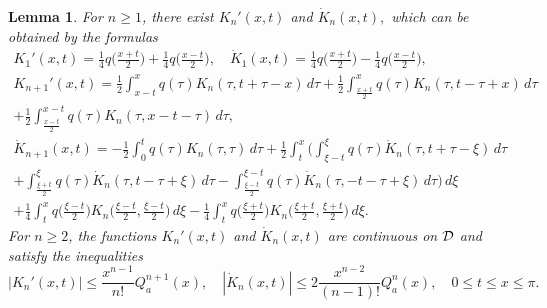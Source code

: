 \documentclass[a4paper, 12pt] {article}
\theoremstyle{plain}
\newtheorem{lemma}{\indent Lemma}
\theoremstyle{remark}
\theoremstyle{plain}
\theoremstyle{definition}
\numberwithin{equation}{section}
\begin{document}
\begin{lemma}
For $n \ge 1$, there exist $K_n'(x, t)$ and $\dot K_n(x, t),$ which can be obtained by the formulas
\begin{equation} \label{first der}
\begin{split}
K_1'(x,t) = \frac{1}{4} q\Big(\frac{x+t}{2}\Big) + \frac{1}{4}q\Big(\frac{x-t}{2}\Big),
\quad {\dot K}_1(x, t) = \frac14 q\Big(\frac{x+t}{2}\Big) - \frac14 q\Big(\frac{x-t}{2}\Big),
\\[2mm]
K_{n+1}'(x, t) = \frac12 \int_{x-t}^x q(\tau) K_n(\tau, t + \tau - x) \,d\tau + \frac12 \int_{\frac{x+t}{2}}^x q(\tau) K_n(\tau, t-\tau+x)\,d\tau \\
+\frac12 \int_{\frac{x-t}{2}}^{x-t} q(\tau) K_n(\tau,x-t-\tau)\,d\tau,
\\
{\dot K}_{n+1}(x, t) = -\frac{1}{2} \int_0^t q(\tau) K_n(\tau, \tau) \, d\tau +\frac12 \int_t^x \Bigg(\int_{\xi-t}^\xi q(\tau){\dot K}_n(\tau, t+\tau-\xi)\,d\tau \\
+\int_{\frac{\xi+t}{2}}^\xi q(\tau){\dot K}_n(\tau, t-\tau+\xi)\,d\tau 
- \int_{\frac{\xi-t}{2}}^{\xi-t} q(\tau){\dot K}_n(\tau, -t-\tau+\xi)\,d\tau\Bigg)\,d\xi \\
+ \frac{1}{4} \int_t^x q\Big(\frac{\xi-t}{2}\Big) K_n\Big(\frac{\xi-t}{2},\frac{\xi-t}{2}\Big) \,d\xi
- \frac{1}{4} \int_t^x q\Big(\frac{\xi+t}{2}\Big) K_n\Big(\frac{\xi+t}{2},\frac{\xi+t}{2}\Big)\, d\xi.
\end{split}
\end{equation}
For $n \ge 2$, the functions $K_n'(x, t)$ and $\dot{K}_n(x, t)$ are continuous on $\cal D$ and satisfy the inequalities
\begin{equation} \label{K' est}
|K_{n}'(x, t)| \le \frac{x^{n-1}}{n!}Q_a^{n+1}(x), \quad |\dot K_{n}(x, t)| \le 2 \frac{x^{n-2}}{(n-1)!}Q^{n}_a(x), \quad 0 \le t \le x \le \pi.
\end{equation}
\end{lemma}
\end{document}
